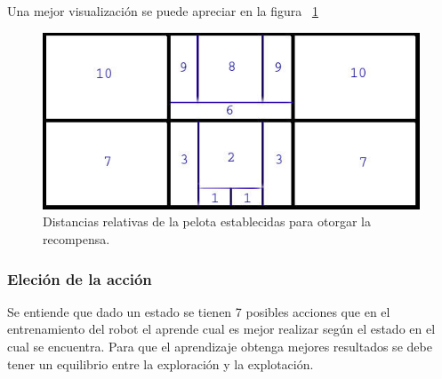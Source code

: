 Una mejor visualizaci\'on se puede apreciar en la figura ~\ref{fig:distancias}
\begin{figure}[hbtp]
\centering
\includegraphics[scale=0.5]{imagenes/Distancias.jpg}
\caption{Distancias relativas de la pelota establecidas para otorgar la recompensa.}
\label{fig:distancias}
\end{figure}


\subsubsection{Eleci\'on de la acci\'on}


Se entiende que dado un estado se tienen 7 posibles acciones que en el entrenamiento del robot el aprende cual es mejor realizar según el estado en el cual se encuentra. Para que el aprendizaje obtenga mejores resultados se debe tener un equilibrio entre la exploración y la explotación. 

 
 
 
 
 